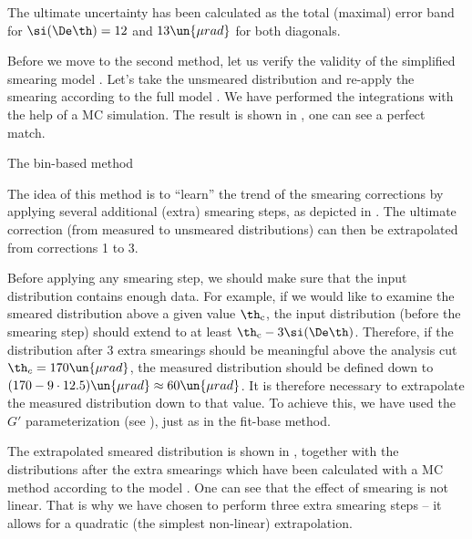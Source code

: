 The ultimate uncertainty has been calculated as the total (maximal) error band for $\si(\De\th) = 12$ and $13\un{\mu rad}$ for both diagonals.

Before we move to the second method, let us verify the validity of the simplified smearing model . Let's take the unsmeared distribution and re-apply the smearing according to the full model . We have performed the integrations with the help of a MC simulation. The result is shown in , one can see a perfect match.


\caption{The bin-based method}

The idea of this method is to ``learn'' the trend of the smearing corrections by applying several additional (extra) smearing steps, as depicted in . The ultimate correction (from measured to unsmeared distributions) can then be extrapolated from corrections 1 to 3.


Before applying any smearing step, we should make sure that the input distribution contains enough data. For example, if we would like to examine the smeared distribution above a given value $\th_{\rm c}$, the input distribution (before the smearing step) should extend to at least $\th_{\rm c} -3\si(\De\th)$. Therefore, if the distribution after 3 extra smearings should be meaningful above the analysis cut $\th_c = 170\un{\mu rad}$, the measured distribution should be defined down to $(170 - 9\cdot 12.5) \un{\mu rad}\approx 60 \un{\mu rad}$. It is therefore necessary to extrapolate the measured distribution down to that value. To achieve this, we have used the $G'$ parameterization (see ), just as in the fit-base method.

The extrapolated smeared distribution is shown in , together with the distributions after the extra smearings which have been calculated with a MC method according to the model . One can see that the effect of smearing is not linear. That is why we have chosen to perform three extra smearing steps -- it allows for a quadratic (the simplest non-linear) extrapolation.

